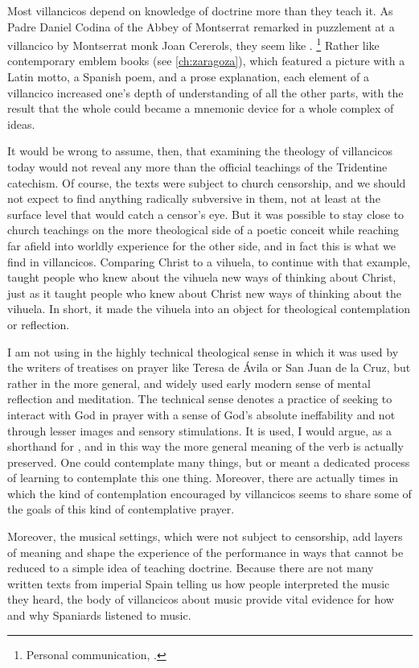 Most villancicos depend on knowledge of doctrine more than they teach it.
As Padre Daniel Codina of the Abbey of Montserrat remarked in puzzlement at a
villancico by Montserrat monk Joan Cererols, they seem like .%
    \footnote{Personal communication, \XXX[date].}
Rather like contemporary emblem books (see \cref{ch:zaragoza}), which featured
a picture with a Latin motto, a Spanish poem, and a prose explanation, each
element of a villancico increased one's depth of understanding of all the other
parts, with the result that the whole could became a mnemonic device for a
whole complex of ideas.

It would be wrong to assume, then, that examining the theology of villancicos
today would not reveal any more than the official teachings of the Tridentine
catechism.
Of course, the texts were subject to church censorship, and we should not
expect to find anything radically subversive in them, not at least at the
surface level that would catch a censor's eye.
But it was possible to stay close to church teachings on the more theological
side of a poetic conceit while reaching far afield into worldly experience for
the other side, and in fact this is what we find in villancicos.
Comparing Christ to a vihuela, to continue with that example, taught people who
knew about the vihuela new ways of thinking about Christ, just as it taught
people who knew about Christ new ways of thinking about the vihuela.
In short, it made the vihuela into an object for theological contemplation or
reflection.%
\begin{Footnote}
    I am not using  in the highly technical theological
    sense in which it was used by the writers of treatises on prayer like
    Teresa de Ávila or San Juan de la Cruz, but rather in the more general, and
    widely used early modern sense of mental reflection and meditation.
    The technical sense denotes a practice of seeking to interact with God in
    prayer with a sense of God's absolute ineffability and not through lesser
    images and sensory stimulations. 
    It is used, I would argue, as a shorthand for , and in this way the more general meaning of the verb is
    actually preserved.
    One could contemplate many things, but  or
     meant a dedicated process of learning to
    contemplate this one thing.
    Moreover, there are actually times in which the kind of contemplation
    encouraged by villancicos seems to share some of the goals of this kind of
    contemplative prayer.
\end{Footnote}
Moreover, the musical settings, which were not subject to censorship, add
layers of meaning and shape the experience of the performance in ways that
cannot be reduced to a simple idea of teaching doctrine.
Because there are not many written texts from imperial Spain telling us how
people interpreted the music they heard, the body of villancicos about music
provide vital evidence for how and why Spaniards listened to music.

